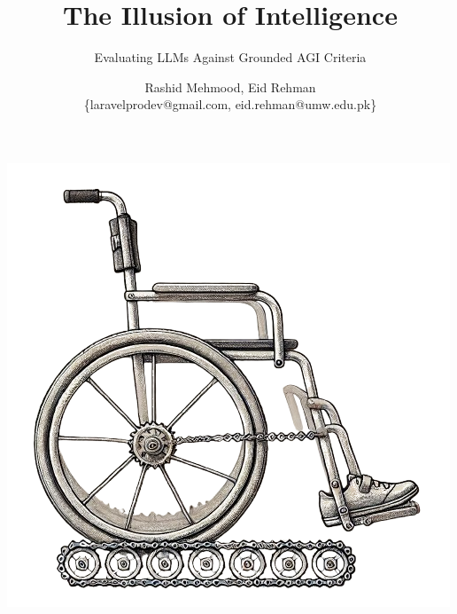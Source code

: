 \documentclass[11pt]{scrartcl}
\begin{document}
\title{The Illusion of Intelligence}
\subtitle{Evaluating LLMs Against Grounded AGI Criteria}
\author{Rashid Mehmood, Eid Rehman \\ \{laravelprodev@gmail.com, eid.rehman@umw.edu.pk\} }

\maketitle

\includegraphics[scale=0.6, center]{title_wheelchair.png}

\vspace{3cm}
\end{document}
